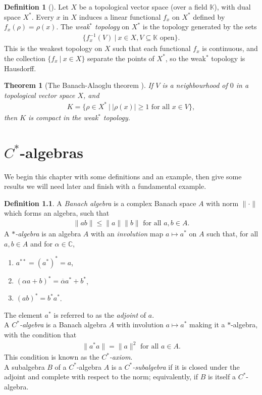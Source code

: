 \documentclass[12pt,a4paper]{report}
\theoremstyle{plain}
\newtheorem*{thm*}{Theorem}
\theoremstyle{definition}
\newtheorem{defn}{Definition}
\newtheorem*{defn*}{Definition}
\newcommand{\1}{\mathbbm{1}}
\newcommand{\C}{\mathbb{C}}
\begin{document}
\begin{defn*}[{\cite[3.14]{rudin91}}]
	Let $X$ be a topological vector space (over a field $\mathbb K$), with dual space $X^\ast$. Every 
	$x$ in $X$ induces a linear functional $f_x$ on $X^\ast$ defined by $f_x(\rho)=\rho(x)$. The 
	\emph{weak$^\ast$ topology} on $X^\ast$ is the topology generated by the sets 
	\begin{align*}
		\{f^{-1}_x(V) ~|~ x \in X, V\subseteq \mathbb K \mbox{ open}\}.
	\end{align*}
	This is the weakest topology on $X$ such that each functional $f_x$ is continuous, and the 
	collection $\{f_x ~|~ x\in X\}$ separate the points of $X^\ast$, so the weak$^\ast$ topology is 
	Hausdorff.
\end{defn*}
\begin{thm*}[{The Banach-Alaoglu theorem \cite{rudin91}}]
	If $V$ is a neighbourhood of $0$ in a topological vector space $X$, and
	\begin{align*}
		K=\{\rho\in X^\ast ~|~ |\rho(x)|\geq 1 \mbox{ for all } x \in V \},
	\end{align*}
	then $K$ is compact in the weak$^\ast$ topology.
\end{thm*}

\chapter{$C^\ast$-algebras}
We begin this chapter with some definitions and an example, then give some results we 
will need later and finish with a fundamental example.
\begin{defn}
	A \emph{Banach algebra} is a complex Banach space $A$ with norm $\|\cdot\|$ which forms an 
	algebra, such that 
	\begin{align*}
		\|ab\| \leq \|a\| \|b\| \mbox{ for all } a,b \in A.
	\end{align*}
	A \emph{$\ast$-algebra} is an algebra $A$ with an \emph{involution} map 
	$a \mapsto a^\ast$ on $A$ such that, for all $a,b \in A$ and for $\alpha \in \C$,
	
	\begin{enumerate}
		\item $a^{\ast\ast} = (a^\ast)^\ast = a$,
		\item $(\alpha a+b)^\ast = \overline{\alpha} a^\ast + b^\ast$,
		\item $(ab)^\ast = b^\ast a^\ast$.
	\end{enumerate}
	The element $a^\ast$ is referred to as the \emph{adjoint} of $a$. 		\\
	A \emph{$C^\ast$-algebra} is a Banach algebra $A$ with involution $a \mapsto a^\ast$ making it a 
	$\ast$-algebra, with the condition that
	\begin{align*}
		\|a ^\ast a\| = \|a\|^2 \mbox{ for all } a \in A.
	\end{align*}
	This condition is known as the \emph{$C^\ast$-axiom}.\\
	A subalgebra $B$ of a $C^\ast$-algebra $A$ is a \emph{$C^\ast$-subalgebra} if it is closed under the 
	adjoint and complete with respect to the norm; equivalently, if $B$ is itself a $C^\ast$-algebra.
\end{defn}
\end{document}

